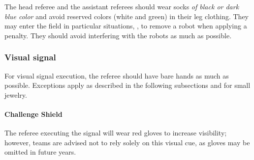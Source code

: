 The head referee and the assistant referees should wear socks \emph{of black or dark blue color} and avoid reserved colors (white and green) in their leg clothing.
They may enter the field in particular situations, \eg, to remove a robot when applying a penalty.
They should avoid interfering with the robots as much as possible.

\subsubsection{Visual signal}
\label{sec:visual-signal}

For visual signal execution, the referee should have bare hands as much as possible.
Exceptions apply as described in the following subsections and for small jewelry.

\paragraph{Challenge Shield}

The referee executing the signal will wear red gloves to increase visibility; however, teams are advised not to rely solely on this visual cue, as gloves may be omitted in future years.
